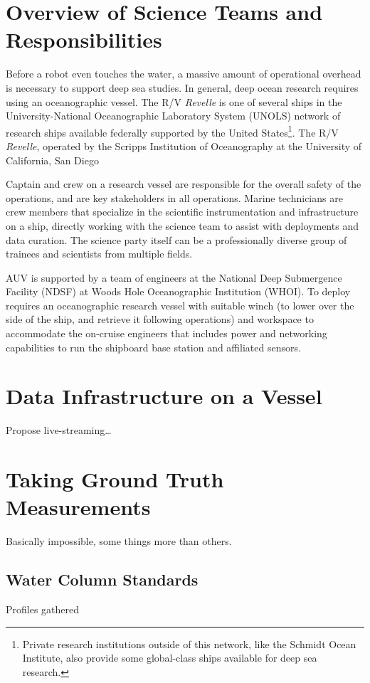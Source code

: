 \section{Overview of Science Teams and Responsibilities}
Before a robot even touches the water, a massive amount of operational overhead is necessary to support deep sea studies. In general, deep ocean research requires using an oceanographic vessel. The R/V \emph{Revelle} is one of several ships in the University-National Oceanographic Laboratory System (UNOLS) network of research ships available federally supported by the United States\footnote{Private research institutions outside of this network, like the Schmidt Ocean Institute, also provide some global-class ships available for deep sea research.}. The R/V \emph{Revelle}, operated by the Scripps Institution of Oceanography at the University of California, San Diego 

Captain and crew on a research vessel are responsible for the overall safety of the operations, and are key stakeholders in all operations. Marine technicians are crew members that specialize in the scientific instrumentation and infrastructure on a ship, directly working with the science team to assist with deployments and data curation. The science party itself can be a professionally diverse group of trainees and scientists from multiple fields. 

AUV \Sentry is supported by a team of engineers at the National Deep Submergence Facility (NDSF) at Woods Hole Oceanographic Institution (WHOI)\autocite{kaiser2016design}. To deploy \Sentry requires an oceanographic research vessel with suitable winch (to lower \Sentry over the side of the ship, and retrieve it following operations) and workspace to accommodate the on-cruise engineers that includes power and networking capabilities to run the shipboard base station and affiliated sensors.

\section{Data Infrastructure on a Vessel}
Propose live-streaming\dots

\section{Taking Ground Truth Measurements}
Basically impossible, some things more than others.

\subsection{Water Column Standards}
Profiles gathered

